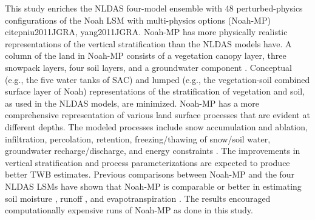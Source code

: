 \documentclass[essd]{copernicus}
\begin{document}
This study enriches the NLDAS four-model ensemble with 48
perturbed-physics configurations of the Noah LSM with multi-physics options
(Noah-MP) citep{niu2011JGRA, yang2011JGRA}. Noah-MP has more physically
realistic representations of the vertical stratification than the
NLDAS models have. A column of the land in Noah-MP consists of a
vegetation canopy layer, three snowpack layers, four soil layers, and a
groundwater component \citep{niu2011JGRA}. Conceptual (e.g., the five water
tanks of SAC) and lumped (e.g., the vegetation-soil combined surface layer of
Noah) representations of the stratification of vegetation and soil, as used in
the NLDAS models, are minimized. Noah-MP has a more comprehensive
representation of various land surface processes that are evident at different
depths. The modeled processes include snow accumulation and ablation,
infiltration, percolation, retention, freezing/thawing of snow/soil water,
groundwater recharge/discharge, and energy constraints \citep{niu2011JGRA}. The
improvements in vertical stratification and process parameterizations are
expected to produce better TWB estimates. Previous comparisons between Noah-MP
and the four NLDAS LSMs have shown that Noah-MP is comparable or
better in estimating soil moisture \citep{cai2014JGRAa}, runoff
\citep{fei2021WRR, cai2014JGRAa}, and evapotranspiration \citep{zhang2020AFM}.
The results encouraged computationally expensive runs of Noah-MP as done in this
study.
\end{document}
